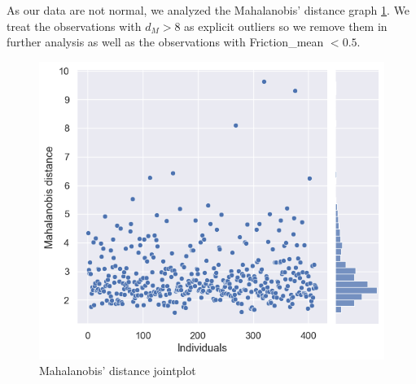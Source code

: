 \documentclass[12pt, bachelor, substylefile = algo_title.rtx]{disser}
\theoremstyle{definition}
\begin{document}
As our data are not normal, we analyzed the Mahalanobis' distance graph \ref{fig: 11}. We treat the observations with $d_M > 8$ as explicit outliers so we remove them in further analysis as well as the observations with Friction\_mean $< 0.5$.
\begin{figure}[!h]
\centering
   \begin{minipage}{0.7\textwidth}
     \includegraphics[width=\linewidth]{mahalanobis}
   \end{minipage}
\caption{Mahalanobis' distance jointplot}
\label{fig: 11}
\end{figure}
\end{document}
